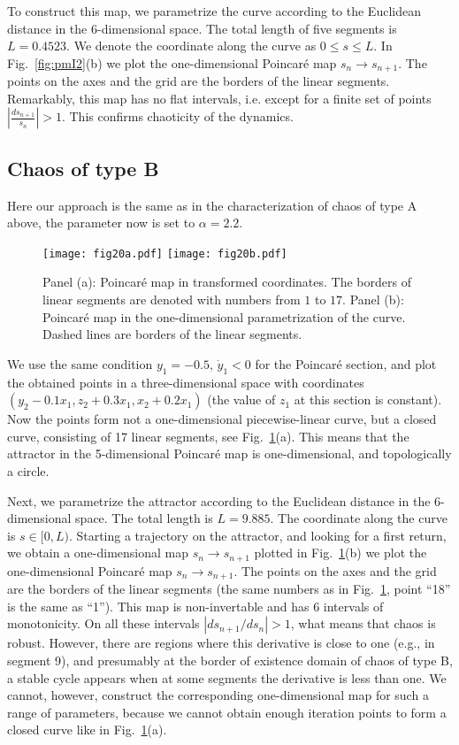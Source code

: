 \documentclass[3p,number,review,sort&compress]{elsarticle}
\begin{document}
To construct this map, we parametrize the curve according to the Euclidean distance in the $6$-dimensional space.
The total length of five segments is $L=0.4523$. We denote the coordinate along the curve as $0\leq s\leq L$.
In Fig.~\ref{fig:pmI2}(b) we plot the one-dimensional Poincar\'e map $s_n\to s_{n+1}$. The points on the
axes and the grid are the borders of the linear segments. Remarkably, this map has no flat intervals, i.e. except
for a finite set of points  $|\frac{d s_{n+1}}{s_n}|>1$. This confirms chaoticity of the dynamics.


\subsection{Chaos of type B}

Here our approach is the same as in the characterization of chaos of type A above,
the parameter now is set to $\alpha=2.2$.


\begin{figure}[!htb]
\centering
\texttt{[image: fig20a.pdf]}\hfill
\texttt{[image: fig20b.pdf]}
\caption{Panel (a): Poincar\'e map in transformed coordinates. 
The borders of linear segments are denoted with numbers from $1$ to $17$.
Panel (b): Poincar\'e map in the one-dimensional parametrization
of the curve. Dashed lines are borders of the linear segments.}
\label{fig:lpm1}
\end{figure}


We use the same condition  $y_1=-0.5$, $\dot y_1<0$
for the Poincar\'e section, and plot
the obtained points in a three-dimensional space with coordinates $(y_2-0.1 x_1, z_2+0.3 x_1, x_2+0.2 x_1)$ (the value
of $z_1$ at this section is constant). Now the points form
not a one-dimensional piecewise-linear curve, but a closed curve,
consisting of 17 linear segments, see Fig.~\ref{fig:lpm1}(a).
This means that the attractor in the 5-dimensional
Poincar\'e map is one-dimensional, and 
topologically a circle. 


Next, we parametrize the attractor  according to the Euclidean distance in the $6$-dimensional space.
The total length is $L=9.885$. The coordinate along the curve is $ s\in [0, L)$. Starting a trajectory on the attractor, and looking for a first return, we obtain a one-dimensional map  $s_n\to s_{n+1}$ plotted 
in Fig.~\ref{fig:lpm1}(b) we plot the one-dimensional Poincar\'e map $s_n\to s_{n+1}$. The points on the
axes and the grid are the borders of the linear segments (the same numbers as 
in Fig.~\ref{fig:lpm1}, point ``18'' is the same as ``1'').
This map is non-invertable and has 6 intervals of 
monotonicity. On all these intervals $|d s_{n+1}/d s_n|>1$,
what means that chaos is robust. However, there are regions where this
derivative is close to one (e.g., in segment 9), and presumably at the border of existence domain of chaos of type B, a stable cycle appears when at some segments the derivative
is less than one. We cannot, however, construct the corresponding
one-dimensional map for such a range of parameters, 
because we cannot obtain enough iteration points to form a closed curve like in Fig.~\ref{fig:lpm1}(a).
\end{document}
